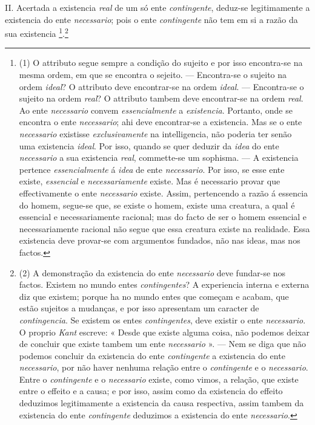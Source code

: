 II. Acertada a existencia \emph{real} de um só ente \emph{contingente}, deduz-se legitimamente a existencia do ente \emph{necessario}; pois o ente \emph{contingente} não tem em si a razão da sua existencia \footnote{(1) O attributo segue sempre a condição do sujeito e por isso encontra-se na mesma ordem, em que se encontra o sejeito. --- Encontra-se o sujeito na ordem \emph{ideal}? O attributo deve encontrar-se na ordem \emph{ideal}. --- Encontra-se o sujeito na ordem \emph{real}? O attributo tambem deve encontrar-se na ordem \emph{real}. Ao ente \emph{necessario} convem \emph{essencialmente} a \emph{existencia}. Portanto, onde se encontra o ente \emph{necessario}; ahi deve encontrar-se a existencia. Mas se o ente \emph{necessario} existisse \emph{exclusivamente} na intelligencia, não poderia ter senão uma existencia \emph{ideal}. Por isso, quando se quer deduzir da \emph{idea} do ente \emph{necessario} a sua existencia \emph{real}, commette-se um sophisma. --- A existencia pertence \emph{essencialmente} á \emph{idea} de ente \emph{necessario}. Por isso, se esse ente existe, \emph{essencial} e \emph{necessariamente} existe. Mas é necessario provar que effectivamente o ente \emph{necessario} existe. Assim, pertencendo a razão á essencia do homem, segue-se que, se existe o homem, existe uma creatura, a qual é essencial e necessariamente racional; mas do facto de ser o homem essencial e necessariamente racional não segue que essa creatura existe na realidade. Essa existencia deve provar-se com argumentos fundados, não nas ideas, mas nos factos.}.\footnote{(2) A demonstração da existencia do ente \emph{necessario} deve fundar-se nos factos. Existem no mundo entes \emph{contingentes}? A experiencia interna e externa diz que existem; porque ha no mundo entes que começam e acabam, que estão sujeitos a mudanças, e por isso apresentam um caracter de \emph{contingencia}. Se existem os entes \emph{contingentes}, deve existir o ente \emph{necessario}. O proprio \emph{Kant} escreve: « Desde que existe alguma coisa, não podemos deixar de concluir que existe tambem um ente \emph{necessario} ». --- Nem se diga que não podemos concluir da existencia do ente \emph{contingente} a existencia do ente \emph{necessario}, por não haver nenhuma relação entre o \emph{contingente} e o \emph{necessario}. Entre o \emph{contingente} e o \emph{necessario} existe, como vimos, a relação, que existe entre o effeito e a causa; e por isso, assim como da existencia do effeito deduzimos legitimamente a existencia da causa respectiva, assim tambem da existencia do ente \emph{contingente} deduzimos a existencia do ente \emph{necessario}.}

